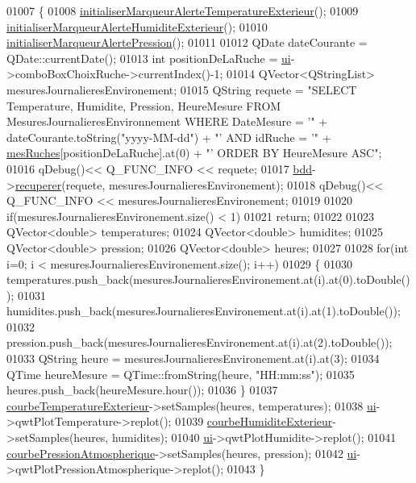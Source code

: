 \begin{DoxyCode}
01007 \{
01008     \hyperlink{class_ruche_ihm_a410bcf0b7ac3ea7134af65d479802c48}{initialiserMarqueurAlerteTemperatureExterieur}();
01009     \hyperlink{class_ruche_ihm_ae572f3f2b76e8c9b14a699d3e29422ee}{initialiserMarqueurAlerteHumiditeExterieur}();
01010     \hyperlink{class_ruche_ihm_a87e4e8d783ea0f15d6304ed604c7ddaa}{initialiserMarqueurAlertePression}();
01011 
01012     QDate dateCourante = QDate::currentDate();
01013     \textcolor{keywordtype}{int} positionDeLaRuche = \hyperlink{class_ruche_ihm_a64786058bd7f88ca2f1e9743bb27c25b}{ui}->comboBoxChoixRuche->currentIndex()-1;
01014     QVector<QStringList> mesuresJournalieresEnvironement;
01015     QString requete = \textcolor{stringliteral}{"SELECT Temperature, Humidite, Pression, HeureMesure FROM
       MesuresJournalieresEnvironnement WHERE DateMesure = '"} + dateCourante.toString(\textcolor{stringliteral}{"yyyy-MM-dd"}) + \textcolor{stringliteral}{"' AND idRuche = '"} + 
      \hyperlink{class_ruche_ihm_ab7741fa67b19cbb2da7eb12c58cf83c1}{mesRuches}[positionDeLaRuche].at(0) + \textcolor{stringliteral}{"' ORDER BY HeureMesure ASC"};
01016     qDebug()<< Q\_FUNC\_INFO << requete;
01017     \hyperlink{class_ruche_ihm_a0851936fe212e8d40538264f09749153}{bdd}->\hyperlink{class_base_de_donnees_a77539baad389f5acf754cd2cd452403e}{recuperer}(requete, mesuresJournalieresEnvironement);
01018     qDebug()<< Q\_FUNC\_INFO << mesuresJournalieresEnvironement;
01019 
01020     \textcolor{keywordflow}{if}(mesuresJournalieresEnvironement.size() < 1)
01021         \textcolor{keywordflow}{return};
01022 
01023     QVector<double> temperatures;
01024     QVector<double> humidites;
01025     QVector<double> pression;
01026     QVector<double> heures;
01027 
01028     \textcolor{keywordflow}{for}(\textcolor{keywordtype}{int} i=0; i < mesuresJournalieresEnvironement.size(); i++)
01029     \{
01030         temperatures.push\_back(mesuresJournalieresEnvironement.at(i).at(0).toDouble());
01031         humidites.push\_back(mesuresJournalieresEnvironement.at(i).at(1).toDouble());
01032         pression.push\_back(mesuresJournalieresEnvironement.at(i).at(2).toDouble());
01033         QString heure = mesuresJournalieresEnvironement.at(i).at(3);
01034         QTime heureMesure = QTime::fromString(heure, \textcolor{stringliteral}{"HH:mm:ss"});
01035         heures.push\_back(heureMesure.hour());
01036     \}
01037     \hyperlink{class_ruche_ihm_a68e72873a859840d3c91b147b8559118}{courbeTemperatureExterieur}->setSamples(heures, temperatures);
01038     \hyperlink{class_ruche_ihm_a64786058bd7f88ca2f1e9743bb27c25b}{ui}->qwtPlotTemperature->replot();
01039     \hyperlink{class_ruche_ihm_a0c9d769a392e3c1332f8908cd9d558eb}{courbeHumiditeExterieur}->setSamples(heures, humidites);
01040     \hyperlink{class_ruche_ihm_a64786058bd7f88ca2f1e9743bb27c25b}{ui}->qwtPlotHumidite->replot();
01041     \hyperlink{class_ruche_ihm_aa6685f1fc20aa4459eab3b0bb3c4d1ef}{courbePressionAtmospherique}->setSamples(heures, pression);
01042     \hyperlink{class_ruche_ihm_a64786058bd7f88ca2f1e9743bb27c25b}{ui}->qwtPlotPressionAtmospherique->replot();
01043 \}
\end{DoxyCode}
